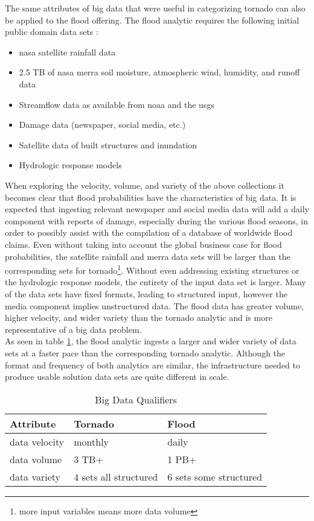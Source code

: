 The same attributes of big data that were useful in categorizing tornado can also be applied to the flood offering. The flood analytic requires the following initial public domain data sets \cite{walker}:
\begin{itemize}
    \item \gls{nasa} satellite rainfall data
    \item 2.5 TB of \gls{nasa} \gls{merra} soil moisture, atmospheric wind, humidity, and runoff data
    \item Streamflow data as available from \gls{noaa} and the \gls{usgs}
    \item Damage data (newspaper, social media, etc.)
    \item Satellite data of built structures and inundation
    \item Hydrologic response models
\end{itemize}
When exploring the velocity, volume, and variety of the above collections it becomes clear that flood probabilities have the characteristics of big data. It is expected that ingesting relevant newspaper and social media data will add a daily component with reports of damage, especially during the various flood seasons, in order to possibly assist with the compilation of a database of worldwide flood claims. Even without taking into account the global business case for flood probabilities, the satellite rainfall and \gls{merra} data sets will be larger than the corresponding sets for tornado\footnote{more input variables means more data volume}. Without even addressing existing structures or the hydrologic response models, the entirety of the input data set is larger. Many of the data sets have fixed formats, leading to structured input, however the media component implies unstructured data. The flood data has greater volume, higher velocity, and wider variety than the tornado analytic and is more representative of a big data problem.\\

As seen in table \ref{qualifiers}, the flood analytic ingests a larger and wider variety of data sets at a faster pace than the corresponding tornado analytic. Although the format and frequency of both analytics are similar, the infrastructure needed to produce usable solution data sets are quite different in scale.
\begin{table}[htbp]
    \centering
    \begin{tabular}{l l l}
        \hline
        Attribute & Tornado & Flood\\ [0.5ex]
        \hline
        data velocity & monthly & daily\\
        data volume &  3 TB+  & 1 PB+\\
        data variety &  4 sets all structured & 6 sets some structured\\
        \hline
    \end{tabular}
    \caption{Big Data Qualifiers}
    \label{qualifiers}
\end{table}
